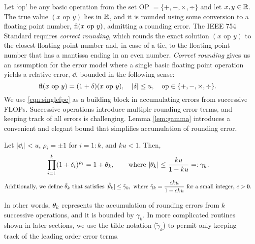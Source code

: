 Let `op' be any basic operation from the set OP $=\{+, -, \times, \div\}$ and let $x,y\in \mathbb{R}$.
The true value $(x\text{ op }y)$ lies in $\mathbb{R}$, and it is rounded using some conversion to a floating point number, $\mathrm{fl}(x\text{ op }y)$, admitting a rounding error. 
The IEEE 754 Standard requires \emph{correct rounding}, which rounds the exact solution $(x\text{ op }y)$ to the closest floating point number and, in case of a tie, to the floating point number that has a mantissa ending in an even number.
\emph{Correct rounding} gives us an assumption for the error model where a single basic floating point operation yields a relative error, $\dd$, bounded in the following sense:
\begin{equation}
\fl(x\text{ op }y) = (1 + \dd)(x\text{ op }y),\quad |\dd|\leq u, \quad \text{op}\in\{+, -, \times, \div\}. \label{eqn:singlefpe}
\end{equation}
We use \cref{eqn:singlefpe} as a building block in accumulating errors from successive FLOPs.
Successive operations introduce multiple rounding error terms, and keeping track of all errors is challenging.
Lemma \ref{lem:gamma} introduces a convenient and elegant bound that simplifies accumulation of rounding error. 
\begin{lemma}
	\label{lem:gamma}
	Let $|\dd_i|<u$, $\rho_i =\pm 1$ for $i=1:k$, and $ku < 1$. Then, 
	\begin{equation}
	\prod_{i=1}^k (1+\delta_i)^{\rho_i} = 1 + \theta_{k},
	\qquad \mbox{where } |\theta_{k}|\leq \frac{ku}{1-ku}=:\gamma_{k}.
	\end{equation}
	$$\mbox{Additionally, we define $\tilde{\theta}_k$ that satisfies }|\tilde{\theta}_k| \leq \tilde{\gamma}_k,\mbox{ where } \tilde{\gamma}_{k} = \frac{cku}{1-cku} \mbox{ for a small integer, $c>0$.}$$
\end{lemma}
In other words, $\theta_{k}$ represents the accumulation of rounding errors from $k$ successive operations, and it is bounded by $\gamma_{k}$. 
In more complicated routines shown in later sections, we use the tilde notation ($\tilde{\gamma}_k$) to permit only keeping track of the leading order error terms.

